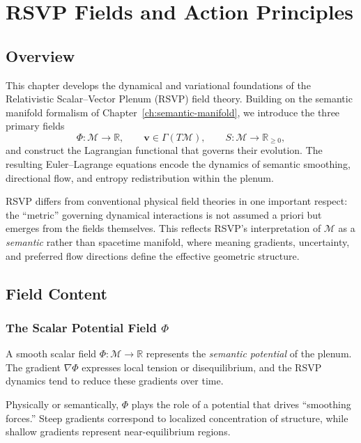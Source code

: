 \chapter{RSVP Fields and Action Principles}
\label{ch:rsvp-fields}

\section{Overview}

This chapter develops the dynamical and variational foundations of the
Relativistic Scalar--Vector Plenum (RSVP) field theory. Building on the semantic
manifold formalism of Chapter~\ref{ch:semantic-manifold}, we introduce the three
primary fields
\[
\Phi : \mathcal{M} \to \mathbb{R}, \qquad
\mathbf{v} \in \Gamma(T\mathcal{M}), \qquad
S : \mathcal{M} \to \mathbb{R}_{\ge 0},
\]
and construct the Lagrangian functional that governs their evolution. The
resulting Euler--Lagrange equations encode the dynamics of semantic
smoothing, directional flow, and entropy redistribution within the plenum.

RSVP differs from conventional physical field theories in one important
respect: the ``metric'' governing dynamical interactions is not assumed a
priori but emerges from the fields themselves. This reflects RSVP’s
interpretation of $\mathcal{M}$ as a \emph{semantic} rather than spacetime
manifold, where meaning gradients, uncertainty, and preferred flow directions
define the effective geometric structure.

\section{Field Content}

\subsection{The Scalar Potential Field \texorpdfstring{$\Phi$}{Φ}}

\begin{definition}
A smooth scalar field $\Phi : \mathcal{M} \to \mathbb{R}$ represents the
\emph{semantic potential} of the plenum. The gradient $\nabla\Phi$ expresses
local tension or disequilibrium, and the RSVP dynamics tend to reduce these
gradients over time.
\end{definition}

Physically or semantically, $\Phi$ plays the role of a potential that drives
``smoothing forces.'' Steep gradients correspond to localized concentration of
structure, while shallow gradients represent near-equilibrium regions.

